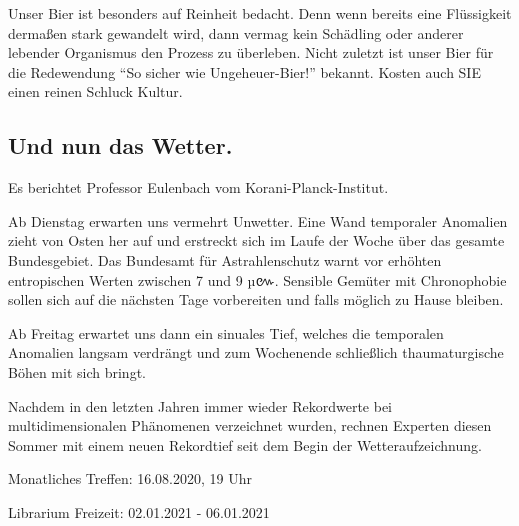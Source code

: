 \documentclass[final]{multiversum}
\begin{document}
Unser Bier ist besonders auf Reinheit bedacht. Denn wenn bereits eine Flüssigkeit dermaßen stark gewandelt wird, dann vermag kein Schädling oder anderer lebender Organismus den Prozess zu überleben. 
Nicht zuletzt ist unser Bier für die Redewendung \enquote{So sicher wie Ungeheuer-Bier!} bekannt. Kosten auch SIE einen reinen Schluck Kultur.


\subsection{Und nun das Wetter.} 
Es berichtet Professor Eulenbach vom Korani-Planck-Institut.

Ab Dienstag erwarten uns vermehrt Unwetter. Eine Wand temporaler Anomalien zieht von Osten her auf und erstreckt sich im Laufe der Woche über das gesamte Bundesgebiet. Das Bundesamt für Astrahlenschutz warnt vor erhöhten entropischen Werten zwischen 7 und 9 µ{\khmerfont៚}. Sensible Gemüter mit Chronophobie sollen sich auf die nächsten Tage vorbereiten und falls möglich zu Hause bleiben.

Ab Freitag erwartet uns dann ein sinuales Tief, welches die temporalen Anomalien langsam verdrängt und zum Wochenende schließlich thaumaturgische Böhen mit sich bringt. 

Nachdem in den letzten Jahren immer wieder Rekordwerte bei multidimensionalen Phänomenen verzeichnet wurden, rechnen Experten diesen Sommer mit einem neuen Rekordtief seit dem Begin der Wetteraufzeichnung. 

\begin{termine}
\item Monatliches Treffen: 16.08.2020, 19 Uhr
\item Librarium Freizeit: 02.01.2021 - 06.01.2021
\end{termine}
\impressum
\end{document}
